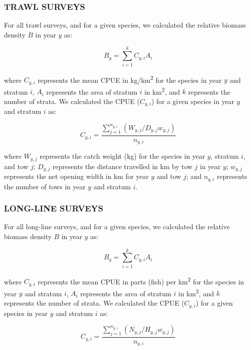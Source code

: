 \documentclass[11pt]{book}\usepackage[]{graphicx}\usepackage[]{color}
\begin{document}
\subsubsection{TRAWL SURVEYS}

For all trawl surveys, and for a given species, we calculated the relative
biomass density $B$ in year $y$ as:

\begin{equation}
  B_y = \sum_{i = 1}^k C_{y,i} A_i
\end{equation}

where $C_{y,i}$ represents the mean CPUE in kg/km\textsuperscript{2} for the
species in year $y$ and stratum $i$, $A_i$ represents the area of stratum $i$ in
km\textsuperscript{2}, and $k$ represents the number of strata. We calculated
the CPUE ($C_{y,i}$) for a given species in year $y$ and stratum $i$ as:

\begin{equation}
  C_{y,i} = \frac{\sum_{j = 1}^{n_{y,i}} \left( W_{y,j} / D_{y,j} w_{y,j}\right)}{n_{y,i}}
\end{equation}

where $W_{y,j}$ represents the catch weight (kg) for the species in year $y$,
stratum $i$, and tow $j$; $D_{y,j}$ represents the distance travelled in km by
tow $j$ in year $y$; $w_{y,j}$ represents the net opening width in km for year
$y$ and tow $j$; and $n_{y,i}$ represents the number of tows in year $y$ and
stratum $i$.

\subsubsection{LONG-LINE SURVEYS}

For all long-line surveys, and for a given species, we calculated the relative
biomass density $B$ in year $y$ as:

\begin{equation}
  B_y = \sum_{i = 1}^k C_{y,i} A_i
\end{equation}

where $C_{y,i}$ represents the mean CPUE in parts (fish) per
km\textsuperscript{2} for the species in year $y$ and stratum $i$, $A_i$
represents the area of stratum $i$ in km\textsuperscript{2}, and $k$ represents
the number of strata. We calculated the CPUE ($C_{y,i}$) for a given species in
year $y$ and stratum $i$ as:

\begin{equation}
  C_{y,i} = \frac{\sum_{j = 1}^{n_{y,i}} \left( N_{y,j} / H_{y,j} w_{y,j}\right)}{n_{y,i}}
\end{equation}
\end{document}
